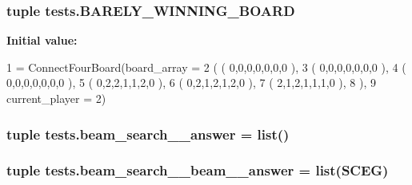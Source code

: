 \subsubsection[{B\+A\+R\+E\+L\+Y\+\_\+\+W\+I\+N\+N\+I\+N\+G\+\_\+\+B\+O\+A\+R\+D}]{\setlength{\rightskip}{0pt plus 5cm}tuple tests.\+B\+A\+R\+E\+L\+Y\+\_\+\+W\+I\+N\+N\+I\+N\+G\+\_\+\+B\+O\+A\+R\+D}\label{namespacetests_aad7560588da32a5e7c87a112a3171521}
{\bfseries Initial value\+:}
\begin{DoxyCode}
1 = ConnectFourBoard(board\_array =
2                                         ( ( 0,0,0,0,0,0,0 ),
3                                           ( 0,0,0,0,0,0,0 ),
4                                           ( 0,0,0,0,0,0,0 ),
5                                           ( 0,2,2,1,1,2,0 ),
6                                           ( 0,2,1,2,1,2,0 ),
7                                           ( 2,1,2,1,1,1,0 ),
8                                           ),
9                                         current\_player = 2)
\end{DoxyCode}
\hypertarget{namespacetests_ae630b7a11ae3117aca8e662e028baa16}{}
\subsubsection[{beam\+\_\+search\+\_\+1\+\_\+answer}]{\setlength{\rightskip}{0pt plus 5cm}tuple tests.\+beam\+\_\+search\+\_\+\_\+answer = list(\textquotesingle{}\textquotesingle{})}\label{namespacetests_ae630b7a11ae3117aca8e662e028baa16}
\hypertarget{namespacetests_aa029d5b0ab71cc26e35f61a7004b4833}{}
\subsubsection[{beam\+\_\+search\+\_\+1\+\_\+beam\+\_\+10\+\_\+answer}]{\setlength{\rightskip}{0pt plus 5cm}tuple tests.\+beam\+\_\+search\+\_\+\_\+beam\+\_\+\_\+answer = list(\textquotesingle{}S\+C\+E\+G\textquotesingle{})}\label{namespacetests_aa029d5b0ab71cc26e35f61a7004b4833}
\hypertarget{namespacetests_a387c20c9a461a16a4c6485ee4ddd20b5}{}
